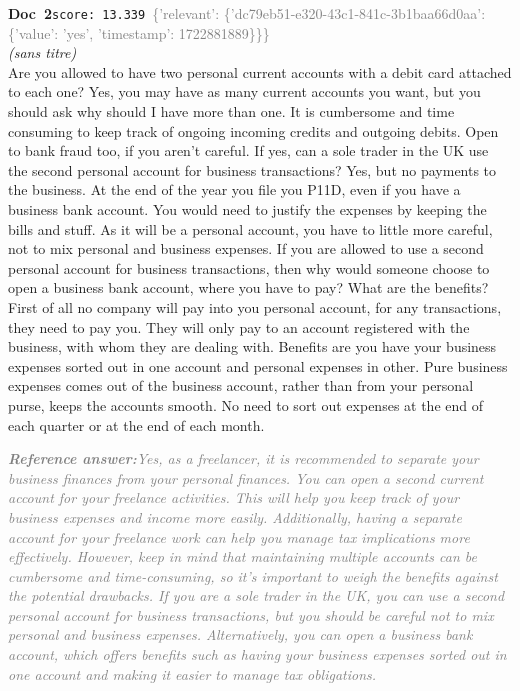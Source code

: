 \documentclass[a4paper,11pt]{article}
\begin{document}
\begin{docenv}
{\footnotesize\textcolor{doccolor}{\textbf{Doc~2}}}\hfill{\tiny\texttt{score:~13.339}}\ {\tiny\textcolor{gray}{\{'relevant': \{'dc79eb51-e320-43c1-841c-3b1baa66d0aa': \{'value': 'yes', 'timestamp': 1722881889\}\}\}}}\\[3pt]
{\small\textit{(sans titre)}}\\[2pt]
\vspace{2pt}
{\footnotesize 
Are you allowed to have two personal current accounts with a debit card attached to each one? Yes, you may have as many current accounts you want, but you should ask why should I have more than one. It is cumbersome and time consuming to keep track of ongoing incoming credits and outgoing debits. Open to bank fraud too, if you aren't careful. If yes, can a sole trader in the UK use the second personal account for business transactions? Yes, but no payments to the business. At the end of the year you file you P11D, even if you have a business bank account. You would need to justify the expenses by keeping the bills and stuff. As it will be a personal account, you have to little more careful, not to mix personal and business expenses.  If you are allowed to use a second personal account for business transactions, then why would someone choose to open a business bank account, where you have to pay? What are the benefits? First of all no company will pay into you personal account, for any transactions, they need to pay you. They will only pay to an account registered with the business, with whom they are dealing with. Benefits are you have your business expenses sorted out in one account and personal expenses in other. Pure business expenses comes out of the business account, rather than from your personal purse, keeps the accounts smooth. No need to sort out expenses at the end of each quarter or at the end of each month.}
\end{docenv}
\begin{refanswerenv}
{\footnotesize\textit{\textcolor{gray}{\textbf{Reference answer:}\enspace Yes, as a freelancer, it is recommended to separate your business finances from your personal finances. You can open a second current account for your freelance activities. This will help you keep track of your business expenses and income more easily. Additionally, having a separate account for your freelance work can help you manage tax implications more effectively. However, keep in mind that maintaining multiple accounts can be cumbersome and time-consuming, so it's important to weigh the benefits against the potential drawbacks. If you are a sole trader in the UK, you can use a second personal account for business transactions, but you should be careful not to mix personal and business expenses. Alternatively, you can open a business bank account, which offers benefits such as having your business expenses sorted out in one account and making it easier to manage tax obligations.}}}
\end{refanswerenv}
\end{document}
